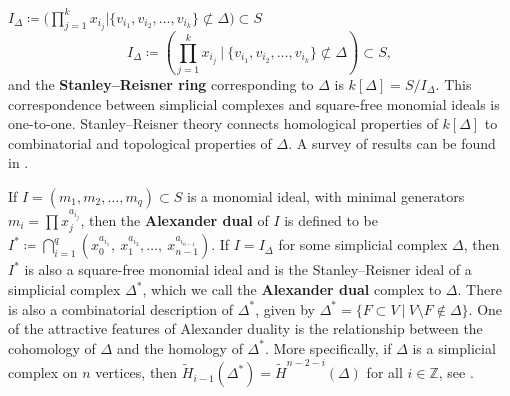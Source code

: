\documentclass[12pt,leqno]{amsart}
\newtheorem{theorem}[lemma]{Theorem}
\theoremstyle{definition}
\begin{document}
$I_\Delta \coloneq \bigl( \prod_{j=1}^k x_{i_j} \mathrel{\big|} \{
v_{i_1},v_{i_2},\dotsc,v_{i_k} \} \not \subset \Delta \bigr) \subset S$
%
\[
  I_\Delta \coloneq \left( \prod_{j=1}^k x_{i_j} \ \bigg\vert \ \{
    v_{i_1},v_{i_2},\dotsc,v_{i_k} \} \not \subset \Delta \right) \subset S,
\]
%
and the \textbf{Stanley--Reisner ring} corresponding to $\Delta$ is
$k[\Delta] = S/I_\Delta$. This correspondence between simplicial complexes and
square-free monomial ideals is one-to-one. Stanley--Reisner theory connects
homological properties of $k[\Delta]$ to combinatorial and topological
properties of $\Delta$. A survey of results can be found in
\cite{BH, Stanley, MS}.

If $I = (m_1, m_2, \dotsc, m_q) \subset S$ is a monomial ideal, with minimal
generators $m_i = \prod x_j^{a_{i_j}}$, then the \textbf{Alexander dual} of
$I$ is defined to be
$I^* \coloneq \bigcap_{i=1}^q (x_0^{a_{i_1}},\ x_1^{a_{i_2}},\dotsc,\
x_{n-1}^{a_{i_{n-1}}})$. If $I = I_\Delta$ for some simplicial complex
$\Delta$, then $I^*$ is also a square-free monomial ideal and is the
Stanley--Reisner ideal of a simplicial complex $\Delta^*$, which we call the
\textbf{Alexander dual} complex to $\Delta$. There is also a combinatorial
description of $\Delta^*$, given by
$\Delta^* = \{ F \subset V \ | \ V \setminus F \not \in \Delta \}$. One of the
attractive features of Alexander duality is the relationship between the
cohomology of $\Delta$ and the homology of $\Delta^*$. More specifically, if
$\Delta$ is a simplicial complex on $n$ vertices, then
$ \widetilde{H}_{i-1}(\Delta^*) = \widetilde{H}^{n-2-i}(\Delta)$ for all
$i \in \mathbb Z$, see \cite[Theorem~5.6]{MS}.
%
%
\end{document}
